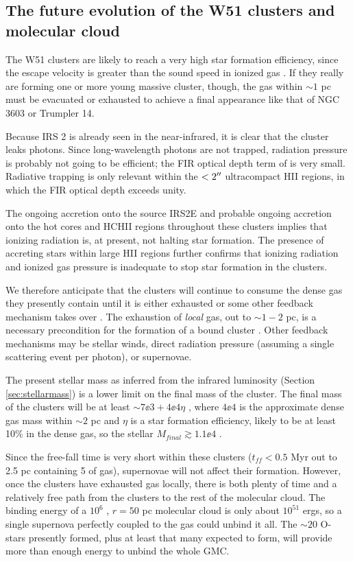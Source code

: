 \subsection{The future evolution of the W51 clusters and molecular cloud}
The W51 clusters are likely to reach a very high star formation efficiency,
since the escape velocity is greater than the sound speed in ionized gas
\citep{Ginsburg2012a,Bressert2012a}.  If they really are forming one or more
young massive cluster, though, the gas within $\sim 1$ pc must be evacuated or
exhausted to achieve a final appearance like that of NGC 3603 or Trumpler 14.

Because IRS 2 is already seen in the near-infrared, it is clear that
the cluster leaks photons.  Since long-wavelength photons are not trapped,
radiation pressure is probably not going to be efficient; the FIR optical depth
term of \citet{Murray2010a} is very small.  Radiative trapping is only
relevant within the $<2\mbox{$^{\prime\prime}$}$ ultracompact HII regions, in which the FIR optical
depth exceeds unity.

The ongoing accretion onto the source IRS2E and probable ongoing accretion onto
the hot cores and HCHII regions throughout these clusters implies that ionizing
radiation is, at present, not halting star formation.  The presence of
accreting stars within large HII regions further confirms that ionizing
radiation and ionized gas pressure is inadequate to stop star formation in the
clusters.

We therefore anticipate that the clusters will continue to consume the dense
gas they presently contain until it is either exhausted or some other feedback
mechanism takes over \citep{Ginsburg2012a,Bressert2012a,Ginsburg2015a}.  The
exhaustion of \emph{local} gas, out to $\sim1-2$ pc, is a necessary
precondition for the formation of a bound cluster \citep{Kruijssen2012a}.
Other feedback mechanisms may be stellar winds, direct radiation pressure
(assuming a single scattering event per photon), or supernovae.

The present stellar mass as inferred from the infrared luminosity (Section
\ref{sec:stellarmass}) is a lower limit on the final mass of the cluster.  The
final mass of the clusters will be at least $\sim7\ee{3} + 4\ee{4} \eta$ \msun,
where $4\ee{4}$ \msun is the approximate dense gas mass within $\sim2$ pc and
$\eta$ is a star formation efficiency, likely to be at least 10\% in the dense
gas, so the stellar $M_{final} \gtrsim 1.1\ee{4}$ \msun.

Since the free-fall time is very short within these clusters ($t_{ff} < 0.5$
Myr out to 2.5 pc containing 5 \msun of gas), supernovae will not affect
their formation.  However, once the clusters have exhausted gas locally, there
is both plenty of time and a relatively free path from the clusters to the rest
of the molecular cloud.  The binding energy of a $10^6$ \msun, $r=50$ pc 
molecular cloud is only about $10^{51}$ ergs, so a single supernova perfectly
coupled to the gas could unbind it all.  The $\sim20$ O-stars presently formed,
plus at least that many expected to form, will provide more than enough energy
to unbind the whole GMC.

